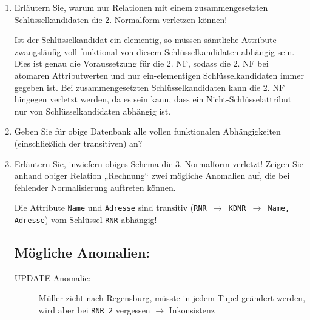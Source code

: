 \documentclass{bschlangaul-aufgabe}
\begin{document}
\begin{enumerate}


\item Erläutern Sie, warum nur Relationen mit einem zusammengesetzten
Schlüsselkandidaten die 2. Normalform verletzen können!

\begin{bAntwort}

Ist der Schlüsselkandidat ein-elementig, so müssen sämtliche Attribute
zwangsläufig voll funktional von diesem Schlüsselkandidaten abhängig
sein. Dies ist genau die Voraussetzung für die 2. NF, sodass die 2. NF
bei atomaren Attributwerten und nur ein-elementigen Schlüsselkandidaten
immer gegeben ist. Bei zusammengesetzten Schlüsselkandidaten kann die 2.
NF hingegen verletzt werden, da es sein kann, dass ein
Nicht-Schlüsselattribut nur von Schlüsselkandidaten abhängig ist.
\end{bAntwort}


\item Geben Sie für obige Datenbank alle vollen funktionalen
Abhängigkeiten (einschließlich der transitiven) an?

\begin{bAntwort}
\ttfamily
{}
\end{bAntwort}


\item Erläutern Sie, inwiefern obiges Schema die 3. Normalform verletzt!
Zeigen Sie anhand obiger Relation „Rechnung“ zwei mögliche Anomalien
auf, die bei fehlender Normalisierung auftreten können.

\begin{bAntwort}
Die Attribute \texttt{Name} und \texttt{Adresse} sind transitiv
(\texttt{RNR $\rightarrow$ KDNR $\rightarrow$ Name, Adresse})
vom Schlüssel \texttt{RNR} abhängig!

\subsection*{Mögliche Anomalien:}

\begin{description}
\item[UPDATE-Anomalie:] Müller zieht nach Regensburg, müsste in jedem
Tupel geändert werden, wird aber bei \texttt{RNR 2} vergessen $\rightarrow$
Inkonsistenz


\end{description}
\end{bAntwort}
\end{enumerate}
\end{document}
